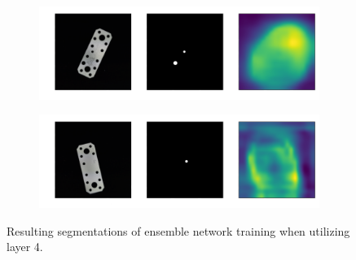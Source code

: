 

\begin{figure}[htbp]
    \centering
    \begin{subfigure}[b]{0.45\textwidth}
        \includegraphics[width=\textwidth]{figures/faillayer34/flat_connector_test_logical_anomalies_001.png}

    \end{subfigure}
    \begin{subfigure}[b]{0.45\textwidth}
        \includegraphics[width=\textwidth]{figures/faillayer34/flat_connector_test_logical_anomalies_023.png}

    \end{subfigure}
    \caption{Resulting segmentations of ensemble network training when utilizing layer 4.}
    \label{fig:faillayersegments}
\end{figure}